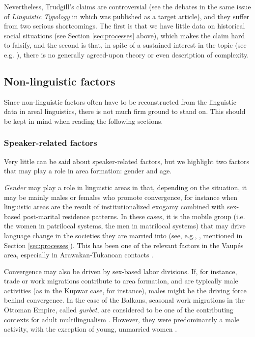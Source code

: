 \documentclass[output=paper]{langscibook}
\begin{document}
Nevertheless, Trudgill's claims are controversial (see the debates in the same issue of \textit{Linguistic Typology} in which \textcite{trudgill2004linguistic} was published as a target article), and they suffer from two serious shortcomings. The first is that we have little data on historical social situations (see Section \ref{sec:processes} above), which makes the claim hard to falsify, and the second is that, in spite of a sustained interest in the topic (see e.g. \citealt{kusters2003linguistic, dahl2004growth, miestamoetal2008language,baermanetal2015understanding}), there is no generally agreed-upon theory or even description of complexity.

\subsection{Non-linguistic factors} \label{subsec:nonlingfactors}

Since non-linguistic factors often have to be reconstructed from the linguistic data in areal linguistics, there is not much firm ground to stand on. This should be kept in mind when reading the following sections.

\subsubsection{Speaker-related factors}

Very little can be said about speaker-related factors, but we highlight two factors that may play a role in area formation: gender and age.

\textit{Gender} may play a role in linguistic areas in that, depending on the situation, it may be mainly males or females who promote convergence, for instance when linguistic areas are the result of institutionalized exogamy combined with sex-based post-marital residence patterns. In these cases, it is the mobile group (i.e. the women in patrilocal systems, the men in matrilocal systems) that may drive language change in the societies they are married into (see, e.g., \citealt{morozova17}, mentioned in Section \ref{sec:processes}). This has been one of the relevant factors in the Vaupés area, especially in Arawakan-Tukanoan contacts \parencite[see][]{Aikhenvald2002Language,chacon2017arawakan,epps2020amazonian,gijn2022social}.

Convergence may also be driven by sex-based labor divisions. If, for instance, trade or work migrations contribute to area formation, and  are typically male activities (as in the Kupwar case, for instance), males might be the driving force behind convergence. In the case of the Balkans, seasonal work migrations in the Ottoman Empire, called \textit{gurbet}, are considered to be one of the contributing contexts for adult multilingualism \parencite{lindstedt2018}. However, they were predominantly a male activity, with the exception of young, unmarried women \parencite[3–5]{hristov2008}. 
\end{document}
